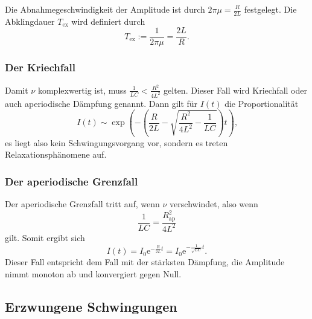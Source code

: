 Die Abnahmegeschwindigkeit der Amplitude ist durch $2 \pi \mu = \frac{R}{2L}$ festgelegt.
Die Abklingdauer $T_{\text{ex}}$ wird definiert durch
\begin{equation}
	T_{\text{ex}} := \frac{1}{2 \pi \mu} = \frac{2L}{R} \text{.}
	\label{eqn:abkling}
\end{equation}

\subsubsection{Der Kriechfall}
Damit $\nu$ komplexwertig ist, muss $\frac{1}{LC} < \frac{R^2}{4L^2}$ gelten.
Dieser Fall wird Kriechfall oder auch aperiodische Dämpfung genannt.
Dann gilt für $I(t)$ die Proportionalität
\begin{equation}
	I(t) \sim \exp\left(-\left(\frac{R}{2L} - \sqrt{\frac{R^2}{4L^2} - \frac{1}{LC}}\right)t\right) \text{,}
\end{equation}
es liegt also kein Schwingungsvorgang vor, sondern es treten Relaxationsphänomene auf.

\subsubsection{Der aperiodische Grenzfall}
Der aperiodische Grenzfall tritt auf, wenn $\nu$ verschwindet, also wenn
\begin{equation}
	\frac{1}{LC} = \frac{R_{\text{ap}}^2}{4L^2}
	\label{eqn:apigrenz}
\end{equation}
gilt.
Somit ergibt sich
\begin{equation}
	I(t) = I_0 \mathrm{e}^{-\frac{R}{2L} t} = I_0 \mathrm{e}^{-\frac{1}{\sqrt{LC}} t} \text{.}
\end{equation}
Dieser Fall entspricht dem Fall mit der stärksten Dämpfung, die Amplitude nimmt monoton ab und
konvergiert gegen Null.


\subsection{Erzwungene Schwingungen}


